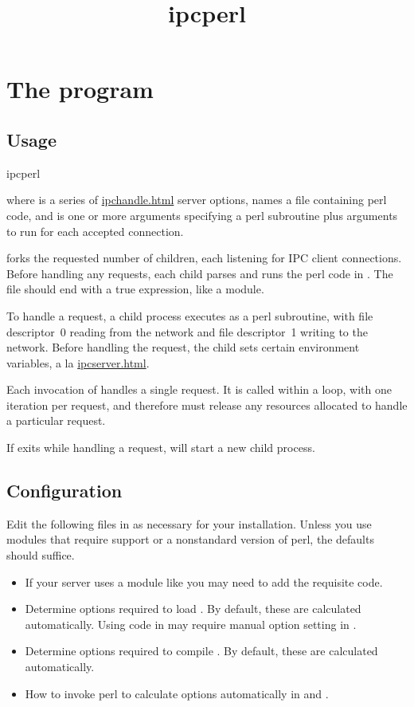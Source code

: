 \documentclass{book}
\title{ipcperl}
\begin{document}
\section{The  program}

\subsection{Usage}
\begin{code}%
  ipcperl   
\end{code}
where  is a series of \href{ipchandle}{ipchandle.html} server
options,  names a file containing perl code, and 
is one or more arguments specifying a perl subroutine plus arguments to
run for each accepted connection.

 forks the requested number of children, each listening for
IPC client connections.  Before handling any requests, each child parses
and runs the perl code in .  The file should end with a true
expression, like a module.

To handle a request, a child process executes  as a perl
subroutine, with file descriptor~0 reading from the network and file
descriptor~1 writing to the network.  Before handling the request, the
child sets certain environment variables, a la
\href{\cmd{ipcserver}}{ipcserver.html}.

Each invocation of  handles a single request.  It is called
within a loop, with one iteration per request, and therefore must
release any resources allocated to handle a particular request.

If  exits while handling a request,  will
start a new child process.


\subsection{Configuration}
Edit the following files in  as necessary for your
installation.  Unless you use modules that require  support or a
nonstandard version of perl, the defaults should suffice.
\begin{itemize}
\item{}
  If your server uses a module like  you may need to add the
  requisite  code.

\item{}
  Determine options required to load .  By default,
  these are calculated automatically.  Using  code in
   may require manual option setting in
  .

\item{}
  Determine options required to compile .  By default,
  these are calculated automatically.

\item{}
  How to invoke perl to calculate options automatically in
   and .
\end{itemize}
\end{document}

